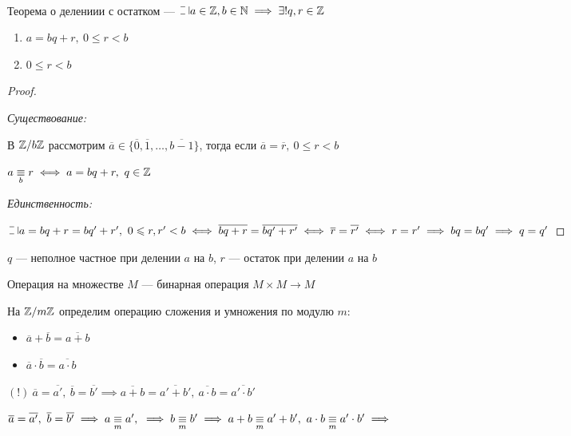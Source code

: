 \begin{follow}~

    Теорема о делениии с остатком --- $\letus a \in \Z, b \in \N \implies \exists! q, r \in \Z$
    \begin{enumerate}
        \item $a = bq + r,~0 \leq r < b$
        \item $0 \leq r < b$
    \end{enumerate}
\end{follow}

\begin{proof}~

    \textsl{Существование:}

    В $\mathbb{Z}/b\mathbb{Z}$ рассмотрим $\overline{a} \in \{\overline{0}, \overline{1}, \ldots, \overline{b-1}\}$, тогда если $\overline{a} = \overline{r},~0 \leq r < b$

    $a \underset{b}{\equiv} r \iff a = bq + r,~q \in \mathbb{Z}$

    \textsl{Единственность:}

    $\letus a = bq + r = bq' + r',~0 \leq r, r' < b \iff \overline{bq+r} = \overline{bq'+r'} \iff \overline{r} = \overline{r'} \iff r = r' \implies bq = bq' \implies q = q'$

\end{proof}

\begin{defn}
    $q$ --- неполное частное при делении $a$ на $b$, $r$ --- остаток при делении $a$ на $b$
\end{defn}

\begin{defn}
    Операция на множестве $M$ --- бинарная операция $M \times M \to M$
\end{defn}

На $\mathbb{Z}/m\mathbb{Z}$ определим операцию сложения и умножения по модулю $m$:

\begin{itemize}
    \item $\overline{a} + \overline{b} = \overline{a + b}$
    
    \item $\overline{a} \cdot \overline{b} = \overline{a \cdot b}$
\end{itemize}

$(!)~\overline{a} = \overline{a'},~\overline{b} = \overline{b'} \implies \overline{a + b} = \overline{a' + b'},~\overline{a \cdot b} = \overline{a' \cdot b'}$

$\overline{a} = \overline{a'},~\overline{b} = \overline{b'} \implies a \underset{m}{\equiv} a',~\implies b \underset{m}{\equiv} b' \implies a + b \underset{m}{\equiv} a' + b',~ a \cdot b \underset{m}{\equiv} a' \cdot b' \implies$

